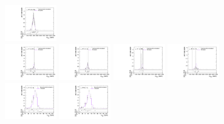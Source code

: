 \begin{figure}[htpb]
  \includegraphics[width=0.2\textwidth]{fig/analysisAppendix/templateVsReco_WprToWZ2000_r0_MVV_mu_LP_nobb_HDy_linear.pdf}\\
  \includegraphics[width=0.2\textwidth]{fig/analysisAppendix/templateVsReco_WprToWZ2000_r0_MVV_mu_HP_vbf_LDy_linear.pdf}
  \includegraphics[width=0.2\textwidth]{fig/analysisAppendix/templateVsReco_WprToWZ2000_r0_MVV_mu_LP_vbf_LDy_linear.pdf}
  \includegraphics[width=0.2\textwidth]{fig/analysisAppendix/templateVsReco_WprToWZ2000_r0_MVV_mu_HP_vbf_HDy_linear.pdf}
  \includegraphics[width=0.2\textwidth]{fig/analysisAppendix/templateVsReco_WprToWZ2000_r0_MVV_mu_LP_vbf_HDy_linear.pdf}\\
  \includegraphics[width=0.2\textwidth]{fig/analysisAppendix/templateVsReco_WprToWZ2000_r0_MJ_mu_HP_bb_LDy.pdf}
  \includegraphics[width=0.2\textwidth]{fig/analysisAppendix/templateVsReco_WprToWZ2000_r0_MJ_mu_LP_bb_LDy.pdf}

\end{figure}
